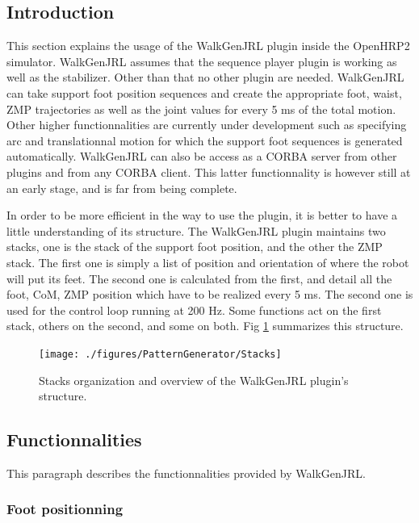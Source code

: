 \subsection{Introduction}
This section explains the usage of the WalkGenJRL plugin inside the OpenHRP2 simulator.
WalkGenJRL assumes that the sequence player plugin is working as well as the stabilizer.
Other than that no other plugin are needed.
WalkGenJRL can take support foot position sequences and create the appropriate foot, waist, ZMP trajectories
as well as the joint values for every 5 ms of the total motion.
Other higher functionnalities are currently under development such as specifying arc and
translationnal motion for which the support foot sequences is generated automatically.
WalkGenJRL can also be access as a CORBA server from other plugins and from
any CORBA client. This latter functionnality is however still at an early stage,
and is far from being complete.
\par
In order to be more efficient in the way to use the  plugin, it is better to have a little understanding of
its structure. The WalkGenJRL plugin maintains two stacks, one is the stack of the support foot position,
and the other the ZMP stack. The first one is simply a list of position and orientation of where the robot will
put its feet. The second one is calculated from the first, and detail all the foot, CoM, ZMP position
which have to be realized every 5 ms. The second one is used for the control loop running at 200 Hz.
Some functions act on the first stack, others on the second, and some on both.
Fig \ref{pic:Stacks} summarizes this structure.
\begin{figure}[htb]
\begin{center}
\texttt{[image: ./figures/PatternGenerator/Stacks]}
\caption{Stacks organization and overview of the WalkGenJRL plugin's structure.}
\label{pic:Stacks}
\end{center}
\end{figure}

\subsection{Functionnalities}

This paragraph describes the functionnalities provided by WalkGenJRL.

\subsubsection{Foot positionning}

